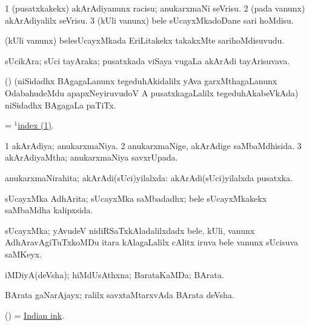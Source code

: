 \bentry
{}
\gl{\sakirx}
\bmng
\bnum
\num{1} (pusatxkakekx) akArAdiyanunx racisu; anukarxmaNi seVrisu. 
\num{2} (pada \mo vanunx) akArAdiyalilx seVrisu. 
\num{3} (kUli \mo vanunx) bele sUcayxMkadoDane sari hoMdisu. 
\enum
\emng
\eentry

\bentry
{}
\gl{\nA}
\bmng
(kUli \mo vanunx) belesUcayxMkada EriLitakekx takakxMte sarihoMdisuvudu. 
\emng
\eentry

\bentry
{}
\gl{\nA}
\bmng
sUcikAra; sUci tayAraka; pusatxkada viSaya \mo vugaLa akArAdi tayArisuvava. 
\emng
\eentry

\bentry
{}
\gl{\nA}
\bmng
(\roVkAyx) (niSidadhx BAgagaLanunx tegeduhAkidalilx yAva garxMthagaLanunx OdabahudeMdu apapxNeyiruvudoV A pusatxkagaLalilx tegeduhAkabeVkAda) niSidadhx BAgagaLa paTiTx. 
\emng
\eentry

\bentry
{}
\gl{\nA}
\bmng
 = \hyperlink{index(1)}{$^1$index (1)}. 
\emng
\eentry

\bentry
{}
\gl{\gu}
\bmng
\bnum
\num{1} akArAdiya; anukarxmaNiya. 
\num{2} anukarxmaNige, akArAdige saMbaMdhisida. 
\num{3} akArAdiyaMtha; anukarxmaNiya savxrUpada. 
\enum
\emng
\eentry

\bentry
{}
\gl{\gu}
\bmng
anukarxmaNirahita; akArAdi(sUci)yilalxda:  akArAdi(sUci)yilalxda pusatxka. 
\emng
\eentry

\bentry
{}
\gl{\gu}
\bmng
sUcayxMka AdhArita; sUcayxMka saMbadadhx; bele sUcayxMkakekx saMbaMdha kalipxsida. 
\emng
\eentry

\bentry
{}
\gl{\nA}
\bmng
sUcayxMka; yAvudeV nidiRSaTxkAladalilxdadx bele, kUli, \mo vanunx AdhAravAgiTuTxkoMDu itara kAlagaLalilx cAlitx iruva bele \mo vanunx sUcisuva saMKeyx. 
\emng
\eentry

\bentry
{}
\gl{\nA}
\bmng
iMDiyA(deVsha); hiMdUsAthxna; BarataKaMDa; BArata. 
\emng

\noindent
\gl{\pagu}
\bmng
{} BArata gaNarAjayx; ralilx savxtaMtarxvAda BArata deVsha. 
\emng
\eentry

\bentry
{}
\gl{\nA}
\bmng
(\ame)  = \hyperlink{Indian ink}{Indian ink}. 
\emng
\eentry

